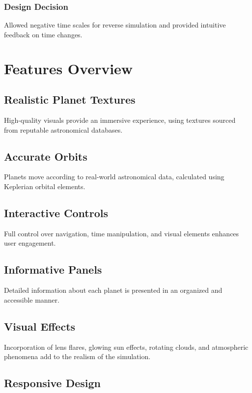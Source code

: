 \documentclass[12pt, a4paper]{article}
\begin{document}
\subsubsection{Design Decision}

Allowed negative time scales for reverse simulation and provided intuitive
feedback on time changes.

\section{Features Overview}

\subsection{Realistic Planet Textures}

High-quality visuals provide an immersive experience, using textures sourced
from reputable astronomical databases.

\subsection{Accurate Orbits}

Planets move according to real-world astronomical data, calculated using
Keplerian orbital elements.

\subsection{Interactive Controls}

Full control over navigation, time manipulation, and visual elements enhances
user engagement.

\subsection{Informative Panels}

Detailed information about each planet is presented in an organized and
accessible manner.

\subsection{Visual Effects}

Incorporation of lens flares, glowing sun effects, rotating clouds, and
atmospheric phenomena add to the realism of the simulation.

\subsection{Responsive Design}
\end{document}

